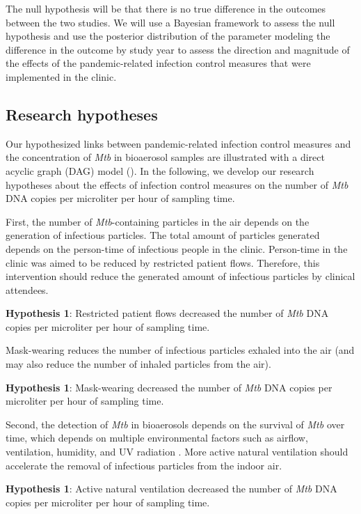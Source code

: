 \documentclass{article}
\newcommand{\forceindent}{\leavevmode{\parindent=1em\indent}}
\begin{document}
The null hypothesis will be that there is no true difference in the outcomes between the two studies. We will use a Bayesian framework to assess the null hypothesis and use the posterior distribution of the parameter modeling the difference in the outcome by study year to assess the direction and magnitude of the effects of the pandemic-related infection control measures that were implemented in the clinic. 

\subsection{Research hypotheses}

Our hypothesized links between pandemic-related infection control measures and the concentration of \emph{Mtb} in bioaerosol samples are illustrated with a direct acyclic graph (DAG) model (). In the following, we develop our research hypotheses about the effects of infection control measures on the number of \emph{Mtb} DNA copies per microliter per hour of sampling time. 

First, the number of \emph{Mtb}-containing particles in the air depends on the generation of infectious particles. The total amount of particles generated depends on the person-time of infectious people in the clinic. Person-time in the clinic was aimed to be reduced by restricted patient flows. Therefore, this intervention should reduce the generated amount of infectious particles by clinical attendees. \medskip

\forceindent \textbf{Hypothesis 1}: Restricted patient flows decreased the number of \emph{Mtb} DNA copies per microliter per hour of sampling time. \medskip


Mask-wearing reduces the number of infectious particles exhaled into the air (and may also reduce the number of inhaled particles from the air). \medskip

\forceindent \textbf{Hypothesis 1}: Mask-wearing decreased the number of \emph{Mtb} DNA copies per microliter per hour of sampling time. \medskip

Second, the detection of \emph{Mtb} in bioaerosols depends on the survival of \emph{Mtb} over time, which depends on multiple environmental factors such as airflow, ventilation, humidity, and UV radiation \cite{Wang2021Science}. More active natural ventilation should accelerate the removal of infectious particles from the indoor air. \medskip

\forceindent \textbf{Hypothesis 1}: Active natural ventilation decreased the number of \emph{Mtb} DNA copies per microliter per hour of sampling time. \medskip
\end{document}
